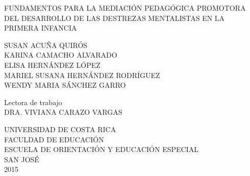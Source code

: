 \begin{titlepage}

\begin{center}
\uppercase{Fundamentos para la mediación pedagógica promotora del desarrollo de las Destrezas Mentalistas en la Primera Infancia}
\end{center}
\begin{center}
\vspace{\baselineskip}
\vspace{\baselineskip}
\vspace{\baselineskip}
\vspace{\baselineskip}
\vspace{\baselineskip}
\uppercase{
Susan Acuña Quirós\\
Karina Camacho Alvarado\\
Elisa Hernández López\\
Mariel Susana Hernández Rodríguez\\
Wendy Maria Sánchez Garro
} 
\end{center}
\vspace{\baselineskip}
\vspace{\baselineskip}
\vspace{\baselineskip}
\begin{center}
Lectora de trabajo\\
\uppercase{Dra. Viviana Carazo Vargas}
\end{center}
\begin{center}
\vspace{\baselineskip}
\vspace{\baselineskip}
\vspace{\baselineskip}
\vspace{\baselineskip}
\uppercase{
Universidad de Costa Rica\\
Faculdad de Educación\\
Escuela de Orientación y Educación Especial\\
San José \\
2015\\
}
\end{center}


\end{titlepage}
